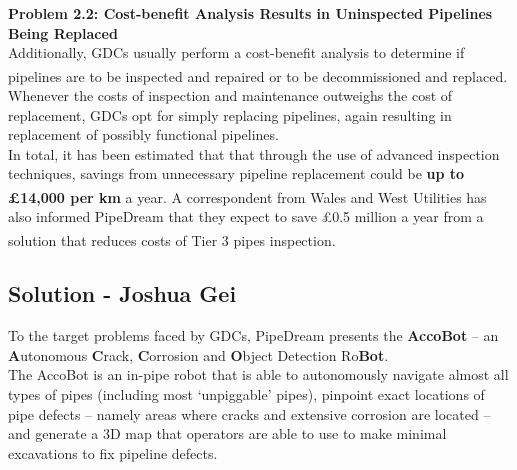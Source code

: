 \documentclass[11pt]{article}		%
\newcommand{\supercite}[1]{\textsuperscript{\cite{#1}}}		%
\newcommand{\sectref}[1]{\hyperref[#1]{Section \ref*{#1}}}     %
\begin{document}
    \textbf{Problem 2.2: Cost-benefit Analysis Results in Uninspected Pipelines Being Replaced}
    \\
    Additionally, GDCs usually perform a cost-benefit analysis to determine if pipelines are to be inspected and repaired or to be decommissioned and replaced\supercite{CBA}. Whenever the costs of inspection and maintenance outweighs the cost of replacement, GDCs opt for simply replacing pipelines, again resulting in replacement of possibly functional pipelines. 
    \\
    \hspace*{2ex}In total, it has been estimated that that through the use of advanced inspection techniques, savings from unnecessary pipeline replacement could be \textbf{up to £14,000 per km} a year\supercite{GRAID}. A correspondent from Wales and West Utilities has also informed PipeDream that they expect to save £0.5 million a year from a solution that reduces costs of Tier 3 pipes inspection\supercite{WWU}. 

	\subsection[Solution]{Solution - Joshua Gei}
	
    To the target problems faced by GDCs, PipeDream presents the \textbf{AccoBot} – an \textbf{A}utonomous \textbf{C}rack, \textbf{C}orrosion and \textbf{O}bject Detection Ro\textbf{Bot}. \\
    \hspace*{2ex}The AccoBot is an in-pipe robot that is able to autonomously navigate almost all types of pipes (including most ‘unpiggable’ pipes), pinpoint exact locations of pipe defects – namely areas where cracks and extensive corrosion are located – and generate a 3D map that operators are able to use to make minimal excavations to fix pipeline defects. 
\end{document}
